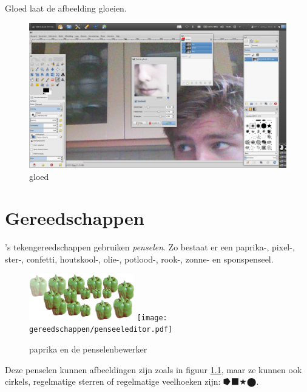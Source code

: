 \documentclass[11pt,a5paper,twoside]{book}
\begin{document}
  \label{ding:gloed}
   Gloed laat de afbeelding gloeien.
   \begin{figure}
    \includegraphics[width=0.9\linewidth]{oppepper/gloed.png}
    \caption{gloed}
    \label{gx:gloed}
   \end{figure}
\chapter{Gereedschappen}
 \label{ding:penseel}
  \GIMP{}’s tekengereedschappen gebruiken \textit{penselen}.
  Zo bestaat er een paprika-, pixel-, ster-, confetti, houtskool-,
   olie-, potlood-, rook-, zonne- en sponspenseel.
  \begin{figure}[btp]%
   \centering%
   \includegraphics[width=0.49\linewidth]{gereedschappen/paprikafestijn.png}
   \texttt{[image: gereedschappen/penseeleditor.pdf]}
   \caption{paprika en de penselenbewerker}
   \label{gx:paprika}
  \end{figure} Deze penselen kunnen afbeeldingen zijn zoals in figuur
   \ref{gx:paprika}, maar ze kunnen ook cirkels, regelmatige sterren of 
    regelmatige veelhoeken zijn: ⭓⬛★⬤.
\end{document}
